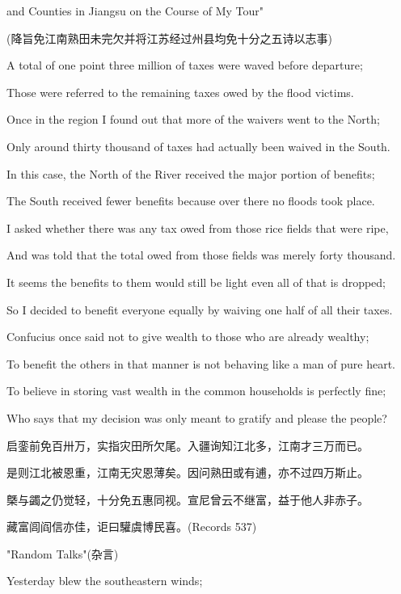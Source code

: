 and Counties in Jiangsu on the Course of My Tour"

\begin{BookQuote}
(降旨免江南熟田未完欠并将江苏经过州县均免十分之五诗以志事)
\end{BookQuote}


\noindent A total of one point three million of taxes were waved before departure;

Those were referred to the remaining taxes owed by the flood victims.

Once in the region I found out that more of the waivers went to the North;

Only around thirty thousand of taxes had actually been waived in the South.

In this case, the North of the River received the major portion of benefits;

The South received fewer benefits because over there no floods took place.

I asked whether there was any tax owed from those rice fields that were ripe,

And was told that the total owed from those fields was merely forty thousand.

It seems the benefits to them would still be light even all of that is dropped;

So I decided to benefit everyone equally by waiving one half of all their taxes.

Confucius once said not to give wealth to those who are already wealthy;

To benefit the others in that manner is not behaving like a man of pure heart.

To believe in storing vast wealth in the common households is perfectly fine;

Who says that my decision was only meant to gratify and please the people?

启銮前免百卅万，实指灾田所欠尾。入疆询知江北多，江南才三万而已。

是则江北被恩重，江南无灾恩薄矣。因问熟田或有逋，亦不过四万斯止。

槩与蠲之仍觉轻，十分免五惠同视。宣尼曾云不继富，益于他人非赤子。

藏富闾阎信亦佳，讵曰驩虞博民喜。(Records 537)


"Random Talks"(杂言)

Yesterday blew the southeastern winds;

